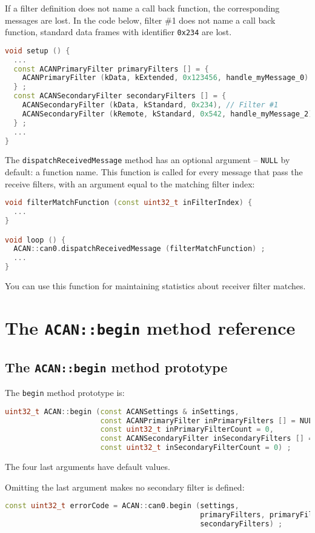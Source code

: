 \documentclass[10pt, a4paper, obeyspaces, openany]{extarticle}
\newcommand \sectionLabel[2]{\section{#1}\label{sec:#2}}
\begin{document}
If a filter definition does not name a call back function, the corresponding messages are lost. In the code below, filter \#1 does not name a call back function, standard data frames with identifier \texttt{0x234} are lost.

{ \small\begin{lstlisting}[language=c++]
void setup () {
  ...
  const ACANPrimaryFilter primaryFilters [] = {
    ACANPrimaryFilter (kData, kExtended, 0x123456, handle_myMessage_0)
  } ;
  const ACANSecondaryFilter secondaryFilters [] = {
    ACANSecondaryFilter (kData, kStandard, 0x234), // Filter #1
    ACANSecondaryFilter (kRemote, kStandard, 0x542, handle_myMessage_2)
  } ;
  ...
}
\end{lstlisting}}


The \texttt{dispatchReceivedMessage} method has an optional argument -- \texttt{NULL} by default: a function name. This function is called for every message that pass the receive filters, with an argument equal to the matching filter index:

{ \small\begin{lstlisting}[language=c++]
void filterMatchFunction (const uint32_t inFilterIndex) {
  ...
}

void loop () {
  ACAN::can0.dispatchReceivedMessage (filterMatchFunction) ;
  ...
}
\end{lstlisting}}

You can use this function for maintaining statistics about receiver filter matches.


\sectionLabel{The \texttt{ACAN::begin} method reference}{beginMethodReference}

\subsection{The \texttt{ACAN::begin} method prototype}

The \texttt{begin} method prototype is:
{ \small\begin{lstlisting}[language=c++]
uint32_t ACAN::begin (const ACANSettings & inSettings,
                      const ACANPrimaryFilter inPrimaryFilters [] = NULL,
                      const uint32_t inPrimaryFilterCount = 0,
                      const ACANSecondaryFilter inSecondaryFilters [] = NULL,
                      const uint32_t inSecondaryFilterCount = 0) ;
\end{lstlisting}}

The four last arguments have default values.

Omitting the last argument makes no secondary filter is defined:
{ \small\begin{lstlisting}[language=c++]
const uint32_t errorCode = ACAN::can0.begin (settings,
                                             primaryFilters, primaryFilterCount,
                                             secondaryFilters) ;
\end{lstlisting}}
\end{document}
